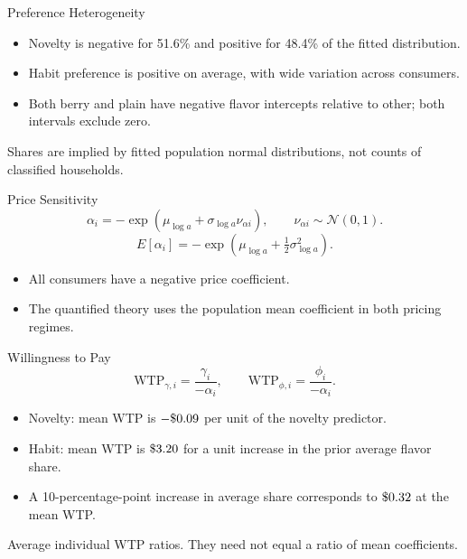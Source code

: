 \gdef\shortbuttons{\hyperlink{short-32}{\beamergotobutton{Back to Distributions}}}
\begin{frame}[label=short-33,noframenumbering]{Preference Heterogeneity}
  \centering
  
  \begin{itemize}
    \item Novelty is negative for 51.6\% and positive for 48.4\% of the fitted distribution.
    \item Habit preference is positive on average, with wide variation across consumers.
    \item Both berry and plain have negative flavor intercepts relative to other; both intervals exclude zero.
  \end{itemize}
  \par\smallskip\raggedright\footnotesize Shares are implied by fitted population normal distributions, not counts of classified households.
\end{frame}

\gdef\shortbuttons{\hyperlink{short-29}{\beamergotobutton{Back to Estimation}}}
\begin{frame}[label=short-price-distribution,noframenumbering]{Price Sensitivity}
  \[
    \alpha_i=-\exp(\mu_{\log a}+\sigma_{\log a}\nu_{\alpha i}),\qquad \nu_{\alpha i}\sim\mathcal N(0,1).
  \]
  \[
    E[\alpha_i]=-\exp(\mu_{\log a}+\tfrac12\sigma_{\log a}^2).
  \]
  \begin{tcolorbox}
    
  \end{tcolorbox}
  \begin{itemize}
    \item All consumers have a negative price coefficient.
    \item The quantified theory uses the population mean coefficient in both pricing regimes.
  \end{itemize}
\end{frame}

\gdef\shortbuttons{\hyperlink{short-31}{\beamergotobutton{Back to WTP}}}
\begin{frame}[label=short-wtp-interpretation,noframenumbering]{Willingness to Pay}
  \[
    \mathrm{WTP}_{\gamma,i}=\frac{\gamma_i}{-\alpha_i},\qquad
    \mathrm{WTP}_{\phi,i}=\frac{\phi_i}{-\alpha_i}.
  \]
  \begin{itemize}
    \item Novelty: mean WTP is $-\$0.09$ per unit of the novelty predictor.
    \item Habit: mean WTP is $\$3.20$ for a unit increase in the prior average flavor share.
    \item A 10-percentage-point increase in average share corresponds to $\$0.32$ at the mean WTP.
  \end{itemize}
  \begin{tcolorbox}
    Average individual WTP ratios. They need not equal a ratio of mean coefficients.
  \end{tcolorbox}
\end{frame}


